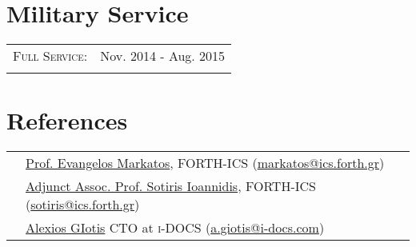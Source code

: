 \documentclass[a4paper,10pt]{article} %
\begin{document}

\section{Military Service}

\begin{tabular}{rl}

\textsc{Full Service:} & Nov. 2014 - Aug. 2015 \\
\\

\end{tabular}


\section{References}

\begin{tabular}{rl}

& \href{https://www.ics.forth.gr/dcs/index_main.php?l=e&c=513}{Prof. Evangelos Markatos}, \textsc{FORTH-ICS} (\href{mailto:markatos@ics.forth.gr}{markatos@ics.forth.gr}) \\
& \href{https://ics.forth.gr/dcs/index_main.php?l=e&c=530}{Adjunct Assoc. Prof. Sotiris Ioannidis}, \textsc{FORTH-ICS} (\href{mailto:sotiris@ics.forth.gr}{sotiris@ics.forth.gr}) \\
& \href{https://www.linkedin.com/in/alexiosgiotis}{Alexios GIotis} CTO at \textsc{i-DOCS} (\href{mailto:a.giotis@i-docs.com}{a.giotis@i-docs.com}) \\

\end{tabular}
\end{document}
